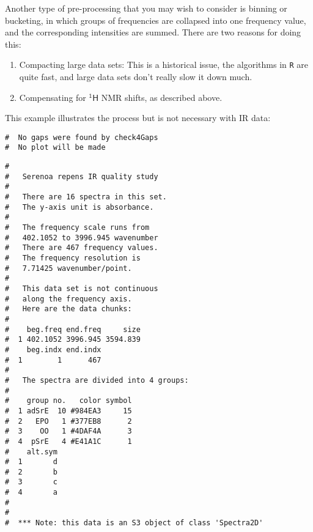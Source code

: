 \documentclass[letter,10pt,twocolumn,twoside,printwatermark=false]{pinp}
\begin{document}
Another type of pre-processing that you may wish to consider is binning
or bucketing, in which groups of frequencies are collapsed into one
frequency value, and the corresponding intensities are summed. There are
two reasons for doing this:

\begin{enumerate}
  \item Compacting large data sets:  This is a historical issue, the algorithms in \texttt{R} are quite fast, and large data sets don't really slow it down much.
  \item  Compensating for $\mathsf{^{1}H}$ NMR shifts, as described above.
\end{enumerate}

This example illustrates the process but is not necessary with IR data:

\begin{Shaded}
\begin{Highlighting}[]
\StringTok{ } \NormalTok{)}
\end{Highlighting}
\end{Shaded}

\begin{ShadedResult}
\begin{verbatim}
#  No gaps were found by check4Gaps
#  No plot will be made
\end{verbatim}
\end{ShadedResult}

\begin{Shaded}
\begin{Highlighting}[]
\end{Highlighting}
\end{Shaded}

\begin{ShadedResult}
\begin{verbatim}
#  
#   Serenoa repens IR quality study 
#  
#   There are 16 spectra in this set.
#   The y-axis unit is absorbance.
#  
#   The frequency scale runs from
#   402.1052 to 3996.945 wavenumber
#   There are 467 frequency values.
#   The frequency resolution is
#   7.71425 wavenumber/point.
#  
#   This data set is not continuous
#   along the frequency axis.
#   Here are the data chunks:
#  
#    beg.freq end.freq     size
#  1 402.1052 3996.945 3594.839
#    beg.indx end.indx
#  1        1      467
#  
#   The spectra are divided into 4 groups: 
#  
#    group no.   color symbol
#  1 adSrE  10 #984EA3     15
#  2   EPO   1 #377EB8      2
#  3    OO   1 #4DAF4A      3
#  4  pSrE   4 #E41A1C      1
#    alt.sym
#  1       d
#  2       b
#  3       c
#  4       a
#  
#  
#  *** Note: this data is an S3 object of class 'Spectra2D'
\end{verbatim}
\end{ShadedResult}
\end{document}
